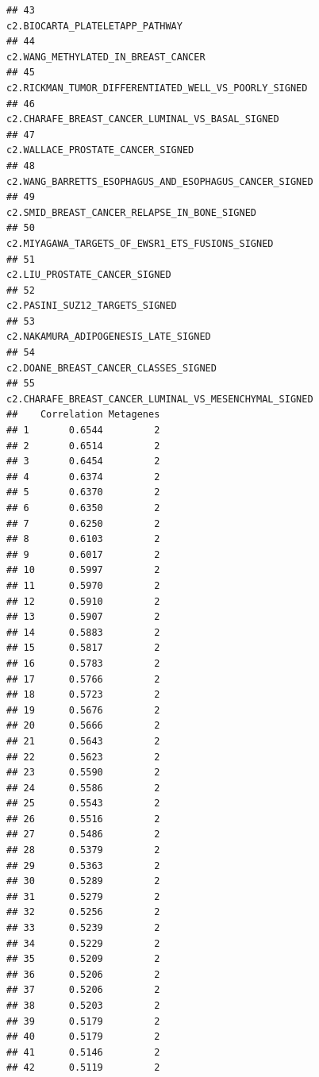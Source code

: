 \documentclass{article}\usepackage[]{graphicx}\usepackage[]{color}
\makeatletter
\newenvironment{kframe}{%
 \def\at@end@of@kframe{}%
 \ifinner\ifhmode%
  \def\at@end@of@kframe{\end{minipage}}%
  \begin{minipage}{\columnwidth}%
 \fi\fi%
 \def\FrameCommand##1{\hskip\@totalleftmargin \hskip-\fboxsep
 \colorbox{shadecolor}{##1}\hskip-\fboxsep
     \hskip-\linewidth \hskip-\@totalleftmargin \hskip\columnwidth}%
 \MakeFramed {\advance\hsize-\width
   \@totalleftmargin\z@ \linewidth\hsize
   \@setminipage}}%
 {\par\unskip\endMakeFramed%
 \at@end@of@kframe}
\newenvironment{knitrout}{}{} %
\makeatother
\begin{document}
\begin{knitrout}
\begin{kframe}
\begin{verbatim}
## 43                                                                        c2.BIOCARTA_PLATELETAPP_PATHWAY
## 44                                                                    c2.WANG_METHYLATED_IN_BREAST_CANCER
## 45                                                  c2.RICKMAN_TUMOR_DIFFERENTIATED_WELL_VS_POORLY_SIGNED
## 46                                                       c2.CHARAFE_BREAST_CANCER_LUMINAL_VS_BASAL_SIGNED
## 47                                                                      c2.WALLACE_PROSTATE_CANCER_SIGNED
## 48                                                 c2.WANG_BARRETTS_ESOPHAGUS_AND_ESOPHAGUS_CANCER_SIGNED
## 49                                                           c2.SMID_BREAST_CANCER_RELAPSE_IN_BONE_SIGNED
## 50                                                        c2.MIYAGAWA_TARGETS_OF_EWSR1_ETS_FUSIONS_SIGNED
## 51                                                                          c2.LIU_PROSTATE_CANCER_SIGNED
## 52                                                                         c2.PASINI_SUZ12_TARGETS_SIGNED
## 53                                                                   c2.NAKAMURA_ADIPOGENESIS_LATE_SIGNED
## 54                                                                  c2.DOANE_BREAST_CANCER_CLASSES_SIGNED
## 55                                                 c2.CHARAFE_BREAST_CANCER_LUMINAL_VS_MESENCHYMAL_SIGNED
##    Correlation Metagenes
## 1       0.6544         2
## 2       0.6514         2
## 3       0.6454         2
## 4       0.6374         2
## 5       0.6370         2
## 6       0.6350         2
## 7       0.6250         2
## 8       0.6103         2
## 9       0.6017         2
## 10      0.5997         2
## 11      0.5970         2
## 12      0.5910         2
## 13      0.5907         2
## 14      0.5883         2
## 15      0.5817         2
## 16      0.5783         2
## 17      0.5766         2
## 18      0.5723         2
## 19      0.5676         2
## 20      0.5666         2
## 21      0.5643         2
## 22      0.5623         2
## 23      0.5590         2
## 24      0.5586         2
## 25      0.5543         2
## 26      0.5516         2
## 27      0.5486         2
## 28      0.5379         2
## 29      0.5363         2
## 30      0.5289         2
## 31      0.5279         2
## 32      0.5256         2
## 33      0.5239         2
## 34      0.5229         2
## 35      0.5209         2
## 36      0.5206         2
## 37      0.5206         2
## 38      0.5203         2
## 39      0.5179         2
## 40      0.5179         2
## 41      0.5146         2
## 42      0.5119         2

\end{verbatim}
\end{kframe}
\end{knitrout}
\end{document}
